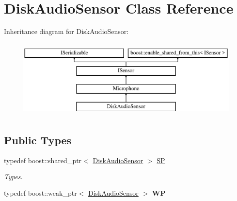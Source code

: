 \hypertarget{class_disk_audio_sensor}{}\section{Disk\+Audio\+Sensor Class Reference}
\label{class_disk_audio_sensor}
Inheritance diagram for Disk\+Audio\+Sensor\+:\begin{figure}[H]
\begin{center}
\leavevmode
\includegraphics[height=4.000000cm]{class_disk_audio_sensor}
\end{center}
\end{figure}
\subsection*{Public Types}
\begin{DoxyCompactItemize}
\item 
\mbox{\label{class_disk_audio_sensor_ace31aa7c9c8645b0355f4ddcb61c6611}} 
typedef boost\+::shared\+\_\+ptr$<$ \hyperlink{class_disk_audio_sensor}{Disk\+Audio\+Sensor} $>$ \hyperlink{class_disk_audio_sensor_ace31aa7c9c8645b0355f4ddcb61c6611}{SP}
\begin{DoxyCompactList}\small\item\em Types. \end{DoxyCompactList}\item 
\mbox{\label{class_disk_audio_sensor_a6207eaecaac1d6b390f715d07d9b08a2}} 
typedef boost\+::weak\+\_\+ptr$<$ \hyperlink{class_disk_audio_sensor}{Disk\+Audio\+Sensor} $>$ {\bfseries WP}
\end{DoxyCompactItemize}
